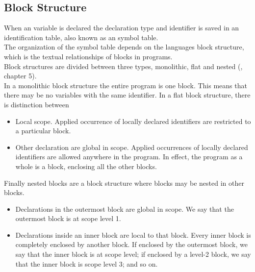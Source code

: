\subsection{Block Structure }
When an variable is declared the declaration type and identifier is saved in an identification table, also known as an symbol table. \\
The organization of the symbol table depends on the languages block structure, which is the textual relationships of blocks in programs. \\
Block structures are divided between three types, monolithic, flat and nested (\cite{compilers-and-intepreters}, chapter 5). \\
In a monolithic block structure the entire program is one block. This means that there may be no variables with the same identifier.
In a flat block structure, there is distinction between
\begin{itemize}
    \item Local scope. Applied occurrence of locally declared identifiers are restricted to a particular block.
    \item Other declaration are global in scope. Applied occurrences of locally declared identifiers are allowed anywhere in the program. 
    In effect, the program as a whole is a block, enclosing all the other blocks.
\end{itemize}
Finally nested blocks are a block structure where blocks may be nested in other blocks. 
\begin{itemize}
    \item Declarations in the outermost block are global in scope. We say that the outermost block is at scope level 1.

    \item Declarations inside an inner block are local to that block. Every inner block is completely enclosed by another block. If enclosed by the outermost block, we say that the inner block is at scope level; if enclosed by a level-2 block, we say that the inner block is scope level 3; and so on.
\end{itemize}

